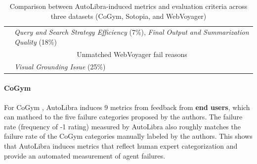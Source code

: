\begin{table}[!t]
\begin{tabular}{@{}lp{}p{}@{}}
        \cmidrule(lr){2-3}
        & \multicolumn{2}{C{0.93\textwidth}}{\cellcolor{unmatched}\textit{Query and Search Strategy Efficiency} (7\%), \textit{Final Output and Summarization Quality} (18\%)} \\
        \cmidrule(lr){2-3}
        & \multicolumn{2}{c}{Unmatched WebVoyager fail reasons} \\
        \cmidrule(lr){2-3}
        & \multicolumn{2}{C{0.93\textwidth}}{\cellcolor{unmatched}\textit{Visual Grounding Issue} (25\%)} \\
        \bottomrule
    \end{tabular}
    \caption{Comparison between AutoLibra-induced metrics and evaluation criteria across three datasets (CoGym, Sotopia, and WebVoyager)}
    \label{tab:merged_comparison}
\end{table}





\paragraph{CoGym}
For CoGym \citep{shao2024collaborative}, 
AutoLibra induces 9 metrics from feedback from \textbf{end users}, which can mathced to the five failure categories proposed by the authors.
The failure rate (frequency of -1 rating) measured by AutoLibra also roughly matches the failure rate of the CoGym categories manually labeled by the authors.
This shows that AutoLibra induces metrics that reflect human expert categorization and provide an automated measurement of agent failures.




